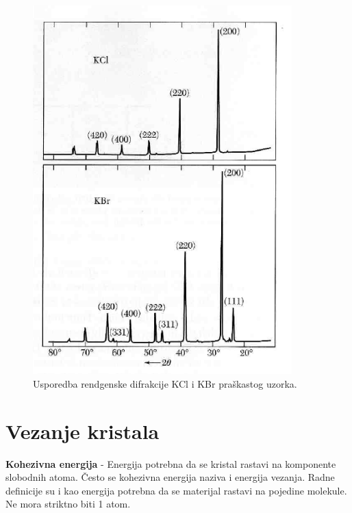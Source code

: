 \documentclass{article}
\numberwithin{equation}{section}
\begin{document}
   \begin{figure}[h!]
       \centering
       \includegraphics[width=10cm]{Difrakcija_S_g_i_AFF.png}
       \caption{Usporedba rendgenske difrakcije KCl i KBr praškastog uzorka.}
       \label{fig:DifrakSGAFF}
   \end{figure}
   
\newpage
\section{Vezanje kristala}
\textbf{Kohezivna energija} - Energija potrebna da se kristal rastavi na komponente slobodnih atoma. Često se kohezivna energija naziva i energija vezanja. Radne definicije su i kao energija potrebna da se materijal rastavi na pojedine molekule. Ne mora striktno biti 1 atom.
\end{document}
